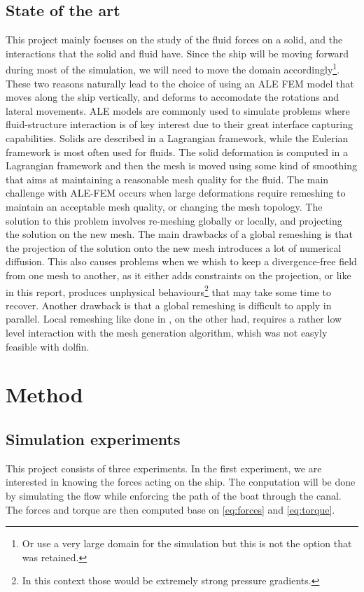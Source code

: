 \documentclass[a4paper]{article}
\begin{document}
\subsection{State of the art}
This project mainly focuses on the study of the fluid forces on a solid, and the interactions that the solid and fluid have. Since the ship will be moving forward during most of the simulation, we will need to move the domain accordingly\footnote{Or use a very large domain for the simulation but this is not the option that was retained.}. These two reasons naturally lead to the choice of using an ALE FEM model that moves along the ship vertically, and deforms to accomodate the rotations and lateral movements. ALE models are commonly used to simulate problems where fluid-structure interaction is of key interest\cite{Jeannette2020Apr}\cite{Wang2018Jul} due to their great interface capturing capabilities. Solids are described in a Lagrangian framework, while the Eulerian framework is most often used for fluids. The solid deformation is computed in a Lagrangian framework and then the mesh is moved using some kind of smoothing that aims at maintaining a reasonable mesh quality for the fluid.  The main challenge with ALE-FEM occurs when large deformations require remeshing to maintain an acceptable mesh quality, or changing the mesh topology. The solution to this problem involves re-meshing globally or locally, and projecting the solution on the new mesh\cite{Remacle2010May}. The main drawbacks of a global remeshing is that the projection of the solution onto the new mesh introduces a lot of numerical diffusion. This also causes problems when we whish to keep a divergence-free field from one mesh to another, as it either adds constraints on the projection, or like in this report, produces unphysical behaviours\footnote{In this context those would be extremely strong pressure gradients.} that may take some time to recover. Another drawback is that a global remeshing is difficult to apply in parallel. Local remeshing like done in \cite{Remacle2010May}, on the other had, requires a rather low level interaction with the mesh generation algorithm, whish was not easyly feasible with dolfin.

\section{Method}
\subsection{Simulation experiments}
This project consists of three experiments. In the first experiment, we are interested in knowing the forces acting on the ship. The conputation will be done by simulating the flow while enforcing the path of the boat through the canal. The forces and torque are then computed base on \eqref{eq:forces} and \eqref{eq:torque}.
\end{document}
